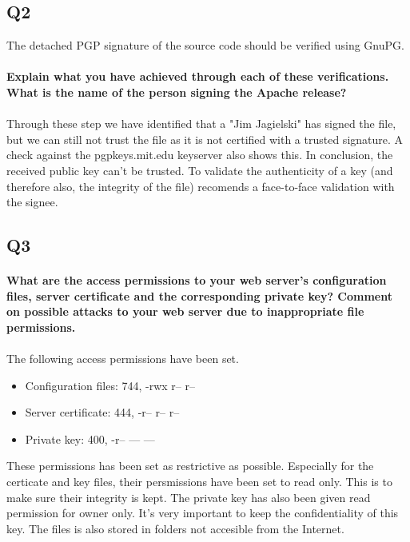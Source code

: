 \documentclass[a4paper,11pt]{article}
\begin{document}
\subsection{Q2}
The detached PGP signature of the source code should be verified using GnuPG.
\paragraph{Explain what you have achieved through each of these veriﬁcations. What is the name of the person signing the Apache release?}
\paragraph{}Through these step we have identified that a "Jim Jagielski" has signed the file, but we can still not trust the file as it is not certified with a trusted signature. A check against the pgpkeys.mit.edu keyserver also shows this. In conclusion, the received public key can't be trusted. To validate the authenticity of a key (and therefore also, the integrity of the file) \cite{4} recomends a face-to-face validation with the signee. 
\subsection{Q3}
\paragraph{What are the access permissions to your web server’s conﬁguration ﬁles, server certiﬁcate and the corresponding private key? Comment on possible attacks to your web server due to inappropriate file permissions.}
\paragraph{}The following access permissions have been set.
\begin{itemize}
	\item Configuration files: 744, -rwx r-- r--
	\item Server certificate: 444, -r-- r-- r--
	\item Private key: 400, -r-- --- ---
\end{itemize}
These permissions has been set as restrictive as possible. Especially for the certicate and key files, their persmissions have been set to read only. This is to make sure their integrity is kept. The private key has also been given read permission for owner only. It's very important to keep the confidentiality of this key. The files is also stored in folders not accesible from the Internet.
\end{document}
